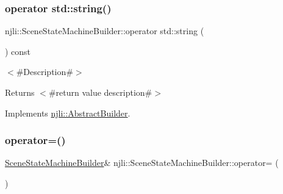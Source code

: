 \subsubsection{\texorpdfstring{operator std\+::string()}{operator std::string()}}
{\footnotesize\ttfamily njli\+::\+Scene\+State\+Machine\+Builder\+::operator std\+::string (\begin{DoxyParamCaption}{ }\end{DoxyParamCaption}) const\hspace{0.3cm}{\ttfamily [virtual]}}

$<$\#\+Description\#$>$

\begin{DoxyReturn}{Returns}
$<$\#return value description\#$>$ 
\end{DoxyReturn}


Implements \mbox{\hyperlink{classnjli_1_1_abstract_builder_a3e6e553e06d1ca30517ad5fb0bd4d000}{njli\+::\+Abstract\+Builder}}.

\mbox{\label{classnjli_1_1_scene_state_machine_builder_a74adb973afa0ffe2ed7da2c033d10134}} 
\subsubsection{\texorpdfstring{operator=()}{operator=()}}
{\footnotesize\ttfamily \mbox{\hyperlink{classnjli_1_1_scene_state_machine_builder}{Scene\+State\+Machine\+Builder}}\& njli\+::\+Scene\+State\+Machine\+Builder\+::operator= (\begin{DoxyParamCaption}\item[{const \mbox{\hyperlink{classnjli_1_1_scene_state_machine_builder}{Scene\+State\+Machine\+Builder}} \&}]{ }\end{DoxyParamCaption})\hspace{0.3cm}{\ttfamily [protected]}}

\mbox{\label{classnjli_1_1_scene_state_machine_builder_ad37279b99a3e8528b24eb24bffc0a940}} 

